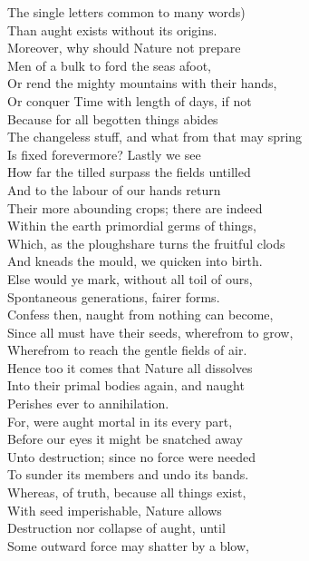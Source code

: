 The single letters common to many words)\\
Than aught exists without its origins.\\
Moreover, why should Nature not prepare\\
Men of a bulk to ford the seas afoot,\\
Or rend the mighty mountains with their hands,\\
Or conquer Time with length of days, if not\\
Because for all begotten things abides\\
The changeless stuff, and what from that may spring\\
Is fixed forevermore? Lastly we see\\
How far the tilled surpass the fields untilled\\
And to the labour of our hands return\\
Their more abounding crops; there are indeed\\
Within the earth primordial germs of things,\\
Which, as the ploughshare turns the fruitful clods\\
And kneads the mould, we quicken into birth.\\
Else would ye mark, without all toil of ours,\\
Spontaneous generations, fairer forms.\\
Confess then, naught from nothing can become,\\
Since all must have their seeds, wherefrom to grow,\\
Wherefrom to reach the gentle fields of air.\\
Hence too it comes that Nature all dissolves\\
Into their primal bodies again, and naught\\
Perishes ever to annihilation.\\
For, were aught mortal in its every part,\\
Before our eyes it might be snatched away\\
Unto destruction; since no force were needed\\
To sunder its members and undo its bands.\\
Whereas, of truth, because all things exist,\\
With seed imperishable, Nature allows\\
Destruction nor collapse of aught, until\\
Some outward force may shatter by a blow,\\
